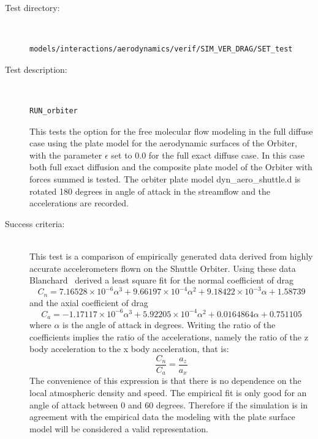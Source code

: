\label{test:fmfo}
\begin{description}
\item[Test directory:] \
\begin{verbatim}models/interactions/aerodynamics/verif/SIM_VER_DRAG/SET_test\end{verbatim}
\item[Test description:] \ \\
\begin{verbatim}RUN_orbiter\end{verbatim}
This tests the option for the free molecular flow
modeling in the full diffuse case using the plate model for the aerodynamic
surfaces of the Orbiter,
with the parameter $\epsilon$ set to 0.0 for
the full exact diffuse case.  In this case both full exact diffusion and
the composite plate model of the Orbiter with forces summed is tested.
The orbiter plate model dyn\_aero\_shuttle.d is rotated 180 degrees in angle
of attack in the streamflow and the accelerations are recorded.
\item[Success criteria:] \ \\
This test is a comparison of empirically generated data derived from
highly accurate accelerometers flown on the Shuttle Orbiter.  Using
these data Blanchard~\cite{Blan} derived a least square fit for the
normal coefficient of drag
\begin{equation}
C_n  = 7.16528 \times 10^{-6} \alpha ^3 + 9.66197 \times 10^{-4} \alpha ^2 + 9.18422 \times 10^{-3} \alpha + 1.58739
\end{equation}
and the axial coefficient of drag
\begin{equation}
C_a  = -1.17117 \times 10^{-6} \alpha ^3 + 5.92205 \times 10^{-4} \alpha ^2 + 0.0164864\alpha + 0.751105
\end{equation}
where $\alpha$ is the angle of attack in degrees.
Writing the ratio of the coefficients implies the ratio of the accelerations,
namely the ratio of the z body acceleration to the x body acceleration, that is:
\begin{equation}
\frac{{C_n }}{{C_a }} = \frac{{a_z }}{{a_x }}
\end{equation}
The convenience of this expression is that there is no dependence
on the local atmospheric density and speed.  The empirical fit is
only good for an angle of attack between  0 and 60 degrees.  Therefore
if the simulation is in agreement with the empirical data the modeling
with the plate surface model will be considered a valid representation.

\end{description}
